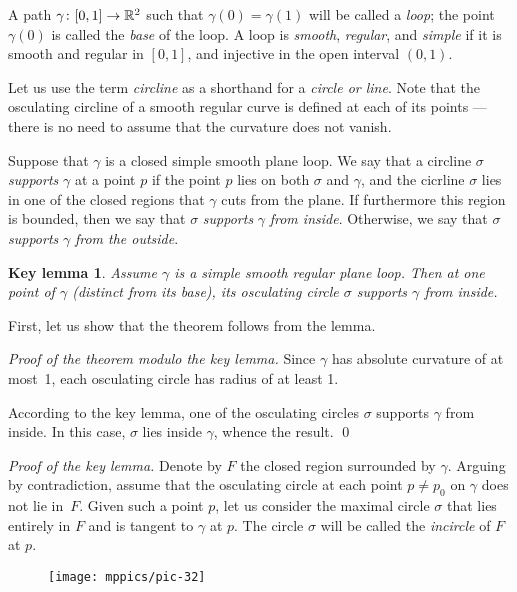 \documentclass{article}
\newcommand*{\z}[1]{#1\nobreak\discretionary{}%
            {\hbox{$\mathsurround=0pt #1$}}{}}
\theoremstyle{theorem}
\newtheorem*{keylemma}{Key lemma}
\theoremstyle{definition}
\begin{document}
\medskip

A path $\gamma\colon [0,1]\z\to \mathbb{R}^2$ such that $\gamma (0) = \gamma (1)$ will be called a \emph{loop};
the point $\gamma (0)$ is called the \emph{base} of the loop.
A loop is \emph{smooth}, \emph{regular}, and \emph{simple} if it is smooth and regular in $[0,1]$, and injective in the open interval $(0,1)$.

Let us use the term \emph{circline} as a shorthand for a \emph{circle or line}.
Note that the osculating circline of a smooth regular curve is defined at each of its points --- there is no need to assume that the curvature does not vanish.

Suppose that $\gamma$ is a closed simple smooth plane loop.
We say that a circline $\sigma$ \emph{supports} $\gamma$ at a point $p$ if the point $p$ lies on both $\sigma$ and $\gamma$, and the cicrline $\sigma$ lies in one of the closed regions that $\gamma$ cuts from the plane.
If furthermore this region is bounded, then  we say that $\sigma$ \emph{supports} $\gamma$ \emph{from inside}.
Otherwise, we say that $\sigma$ \emph{supports} $\gamma$ \emph{from the outside}.

\begin{keylemma}\label{thm:moon}
Assume $\gamma$ is a simple smooth regular plane loop.
Then at one point of $\gamma$ (distinct from its base), its osculating circle $\sigma$ supports $\gamma$ from inside.
\end{keylemma}

First, let us show that the theorem follows from the lemma.

\medskip\noindent\textit{Proof of the theorem modulo the key lemma.}
Since $\gamma$ has absolute curvature of at most~1, each osculating circle has radius of at least 1.

According to the key lemma, one of the osculating circles $\sigma$ supports $\gamma$ from inside.
In this case, $\sigma$ lies inside $\gamma$, whence the result.
\qed

\medskip\noindent\textit{Proof of the key lemma.}
Denote by $F$ the closed region surrounded by $\gamma$.
Arguing by contradiction,
assume that the osculating circle at each point $p\ne p_0$ on $\gamma$ does not lie in~$F$.
Given such a point $p$, let us consider the maximal circle $\sigma$ that lies entirely in $F$ and is tangent to $\gamma$ at $p$.
The circle $\sigma$ will be called the {}\emph{incircle} of $F$ at $p$.
\begin{figure}[!ht]
\vskip-3mm
\centering
\texttt{[image: mppics/pic-32]}
\vskip0mm
\end{figure}
\end{document}
